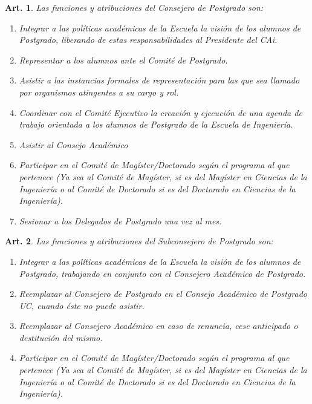\documentclass[letterpaper,11pt]{article}
\theoremstyle{plain}
\newtheorem{art}{Art.} %
\begin{document}
		\begin{art}\label{funcionesCAPostgrado}
			Las funciones y atribuciones del Consejero de Postgrado son:
			\begin{enumerate}
				\item Integrar a las políticas académicas de la Escuela la visión de los alumnos de Postgrado, liberando de estas responsabilidades al Presidente del CAi.
				\item Representar a los alumnos ante el Comité de Postgrado.
				\item Asistir a las instancias formales de representación para las que sea llamado por organismos atingentes a su cargo y rol.
				\item Coordinar con el Comité Ejecutivo la creación y ejecución de una agenda de trabajo orientada a los alumnos de Postgrado de la Escuela de Ingeniería.
				\item Asistir al Consejo Académico
				\item Participar en el Comité de Magíster/Doctorado según el programa al que pertenece (Ya sea al Comité de Magíster, si es del Magíster en Ciencias de la Ingeniería o al Comité de Doctorado si es del Doctorado en Ciencias de la Ingeniería).
				\item Sesionar a los Delegados de Postgrado una vez al mes.
			\end{enumerate}
		\end{art}

		\begin{art}
			Las funciones y atribuciones del Subconsejero de Postgrado son:
			\begin{enumerate}
				\item Integrar a las políticas académicas de la Escuela la visión de los alumnos de Postgrado, trabajando en conjunto con el Consejero Académico de Postgrado.
				\item Reemplazar al Consejero de Postgrado en el Consejo Académico de Postgrado UC, cuando éste no puede asistir.
				\item Reemplazar al Consejero Académico en caso de renuncia, cese anticipado o destitución del mismo.
				\item Participar en el Comité de Magíster/Doctorado según el programa al que pertenece (Ya sea al Comité de Magíster, si es del Magíster en Ciencias de la Ingeniería o al Comité de Doctorado si es del Doctorado en Ciencias de la Ingeniería).
			\end{enumerate}
		\end{art}
\end{document}
